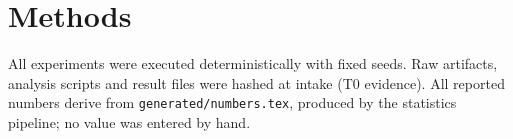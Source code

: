 \section{Methods}
\label{sec:methods}
All experiments were executed deterministically with fixed seeds. Raw artifacts, analysis scripts and result files were hashed at intake (T0 evidence). All reported numbers derive from \texttt{generated/numbers.tex}, produced by the statistics pipeline; no value was entered by hand.
